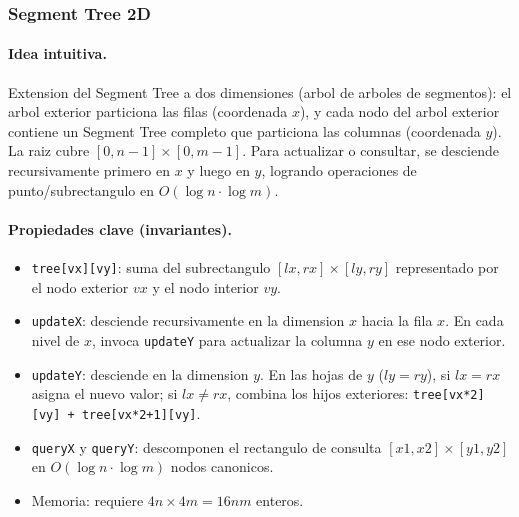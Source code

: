 \subsubsection{Segment Tree 2D}

\paragraph{Idea intuitiva.}
Extension del Segment Tree a dos dimensiones (arbol de arboles de segmentos): el arbol exterior particiona las filas (coordenada $x$), y cada nodo del arbol exterior contiene un Segment Tree completo que particiona las columnas (coordenada $y$). La raiz cubre $[0, n-1] \times [0, m-1]$. Para actualizar o consultar, se desciende recursivamente primero en $x$ y luego en $y$, logrando operaciones de punto/subrectangulo en $O(\log n \cdot \log m)$.

\paragraph{Propiedades clave (invariantes).}
\begin{itemize}\setlength\itemsep{0pt}
	\item \texttt{tree[vx][vy]}: suma del subrectangulo $[lx, rx] \times [ly, ry]$ representado por el nodo exterior $vx$ y el nodo interior $vy$.
	\item \texttt{updateX}: desciende recursivamente en la dimension $x$ hacia la fila $x$. En cada nivel de $x$, invoca \texttt{updateY} para actualizar la columna $y$ en ese nodo exterior.
	\item \texttt{updateY}: desciende en la dimension $y$. En las hojas de $y$ ($ly = ry$), si $lx = rx$ asigna el nuevo valor; si $lx \ne rx$, combina los hijos exteriores: \texttt{tree[vx*2][vy] + tree[vx*2+1][vy]}.
	\item \texttt{queryX} y \texttt{queryY}: descomponen el rectangulo de consulta $[x1, x2] \times [y1, y2]$ en $O(\log n \cdot \log m)$ nodos canonicos.
	\item Memoria: requiere $4n \times 4m = 16nm$ enteros.
\end{itemize}

